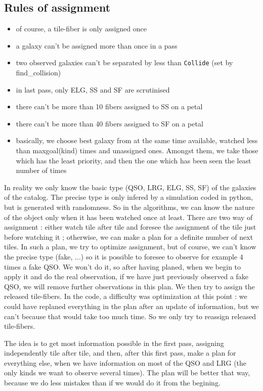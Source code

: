 \documentclass{extarticle}
\begin{document}
\begin{multicols}{2}
\section{Rules of assignment}
\begin{itemize}
	\item of course, a tile-fiber is only assigned once
	\item a galaxy can't be assigned more than once in a pass
	\item two observed galaxies can't be separated by less than {\tt Collide} (set by find\_collision)
	\item in last pass, only ELG, SS and SF are scrutinised
	\item there can't be more than 10 fibers assigned to SS on a petal
	\item there can't be more than 40 fibers assigned to SF on a petal
	\item basically, we choose best galaxy from at the same time available, watched less than maxgoal(kind) times and unassigned ones. Amongst them, we take those which has the least priority, and then the one which has been seen the least number of times
\end{itemize}

In reality we only know the basic type (QSO, LRG, ELG, SS, SF) of the galaxies of the catalog. The precise type is only infered by a simulation coded in python, but is generated with randomness. So in the algorithms, we can know the nature of the object only when it has been watched once at least.
There are two way of assignment : either watch tile after tile and foresee the assignment of the tile just before watching it ; otherwise, we can make a plan for a definite number of next tiles. In such a plan, we try to optimize assignment, but of course, we can't know the precise type (fake, ...) so it is possible to foresee to observe for example 4 times a fake QSO. We won't do it, so after having planed, when we begin to apply it and do the real observation, if we have just previously observed a fake QSO, we will remove further observations in this plan. We then try to assign the released tile-fibers. In the code, a difficulty was optimization at this point : we could have replaned everything in the plan after an update of information, but we can't because that would take too much time. So we only try to reassign released tile-fibers.

The idea is to get most information possible in the first pass, assigning independently tile after tile, and then, after this first pass, make a plan for everything else, when we have information on most of the QSO and LRG (the only kinds we want to observe several times). The plan will be better that way, because we do less mistakes than if we would do it from the begining.



\end{multicols}
\end{document}

